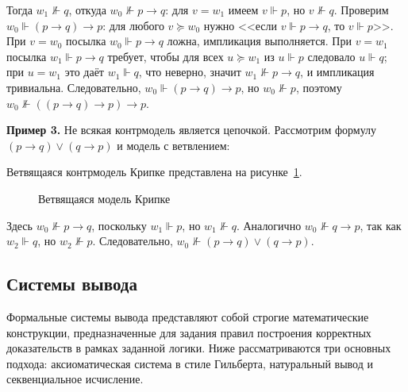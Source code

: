 \documentclass[14pt, russian]{scrartcl}
\begin{document}
Тогда $w_1 \not\Vdash q$, откуда $w_0 \not\Vdash p \rightarrow q$: для
$v = w_1$ имеем $v \Vdash p$, но $v \not\Vdash q$. Проверим
$w_0 \Vdash (p \rightarrow q) \rightarrow p$: для любого $v \succeq w_0$ нужно
<<если $v \Vdash p \rightarrow q$, то $v \Vdash p$>>. При $v = w_0$ посылка
$w_0 \Vdash p \rightarrow q$ ложна, импликация выполняется. При $v = w_1$
посылка $w_1 \Vdash p \rightarrow q$ требует, чтобы для всех $u \succeq w_1$ из
$u \Vdash p$ следовало $u \Vdash q$; при $u = w_1$ это даёт $w_1 \Vdash q$, что
неверно, значит $w_1 \not\Vdash p \rightarrow q$, и импликация тривиальна.
Следовательно, $w_0 \Vdash (p \rightarrow q) \rightarrow p$, но
$w_0 \not\Vdash p$, поэтому
$w_0 \not\Vdash ((p \rightarrow q) \rightarrow p) \rightarrow p$.

\textbf{Пример 3.} Не всякая контрмодель является цепочкой. Рассмотрим формулу
$(p \rightarrow q) \lor (q \rightarrow p)$ и модель с ветвлением:

Ветвящаяся контрмодель Крипке представлена на рисунке~\ref{fig:kripke-branching}.

\begin{figure}[!htb]
\centering
{}
\caption{Ветвящаяся модель Крипке}
\label{fig:kripke-branching}
\end{figure}

Здесь $w_0 \not\Vdash p \rightarrow q$, поскольку $w_1 \Vdash p$, но
$w_1 \not\Vdash q$. Аналогично $w_0 \not\Vdash q \rightarrow p$, так как
$w_2 \Vdash q$, но $w_2 \not\Vdash p$. Следовательно,
$w_0 \not\Vdash (p \rightarrow q) \lor (q \rightarrow p)$.

\subsection{Системы вывода}

Формальные системы вывода представляют собой строгие математические конструкции,
предназначенные для задания правил построения корректных доказательств в рамках
заданной логики. Ниже рассматриваются три основных подхода: аксиоматическая
система в стиле Гильберта, натуральный вывод и секвенциальное исчисление.
\end{document}
